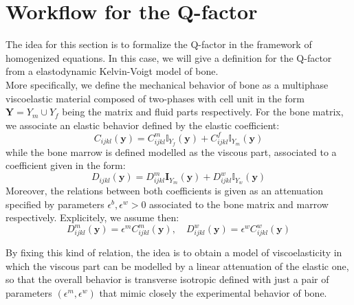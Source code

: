\section{Workflow for the Q-factor}
The idea for this section is to formalize the Q-factor in the framework of homogenized equations.
In this case, we will give a definition for the Q-factor from a elastodynamic Kelvin-Voigt model of bone.\\
More specifically, we define the mechanical behavior of bone as a multiphase viscoelastic material composed of two-phases with cell unit in the form $\mathbf{Y} = Y_{m} \cup Y_{f}$ being the matrix and fluid parts respectively.
For the bone matrix, we associate an elastic behavior defined by the elastic coefficient:
\begin{equation*}
    C_{ijkl}(\mathbf{y}) = C_{ijkl}^m \mathbb{I}_{Y_f}(\mathbf{y}) + C_{ijkl}^f \mathbb{I}_{Y_m}(\mathbf{y})
\end{equation*}
while the bone marrow is defined modelled as the viscous part, associated to a coefficient given in the form:
\begin{equation*}
    D_{ijkl}(\mathbf{y}) =  D_{ijkl}^m \mathbf{I}_{Y_m}(\mathbf{y}) + D_{ijkl}^w \mathbb{I}_{Y_w}(\mathbf{y})
\end{equation*}
Moreover, the relations between both coefficients is given as an attenuation specified by parameters $\epsilon^b, \epsilon^w >0$ associated to the bone matrix and marrow respectively. Explicitely, we assume then:
\begin{equation*}
    D_{ijkl}^m(\mathbf{y}) = \epsilon^m C_{ijkl}^m(\mathbf{y}) , \quad D_{ijkl}^w (\mathbf{y}) = \epsilon^w C_{ijkl}^w(\mathbf{y})
\end{equation*}


\begin{rem}
By fixing this kind of relation, the idea is to obtain a model of viscoelasticity in which the viscous part can be modelled by a linear attenuation of the elastic one, so that the overall behavior is transverse isotropic defined with just a pair of parameters $(\epsilon^m, \epsilon^w)$ that mimic closely the experimental behavior of bone.
\end{rem}

